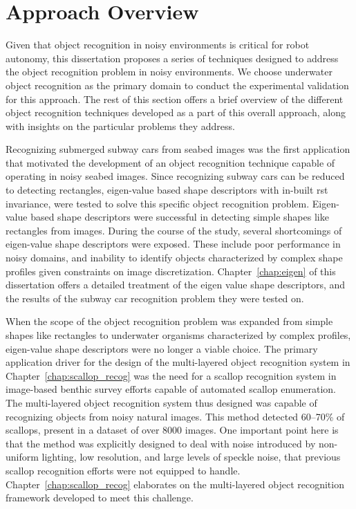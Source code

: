 \section{Approach Overview}

Given that object recognition in noisy environments is critical for robot autonomy, this dissertation proposes a series of techniques designed to address the object recognition problem in noisy environments.
We choose
underwater object recognition as the primary domain to conduct the experimental validation for this approach.
The rest of this section offers a brief overview of the different object recognition techniques developed as a part of this overall approach, along with insights on the particular problems they address.

Recognizing submerged subway cars from seabed images was the first application that motivated the development of an object recognition technique capable of operating in noisy seabed images. Since recognizing subway cars can be reduced 
to detecting rectangles, eigen-value based shape descriptors with in-built \gls{rst} invariance, were tested
to solve this specific object recognition problem. Eigen-value based shape descriptors were successful in detecting 
simple shapes like rectangles from images.
During the course of the study, several shortcomings of eigen-value shape descriptors were exposed. These include poor performance in noisy domains, and inability to identify objects characterized by complex shape profiles given constraints on image discretization. Chapter~\ref{chap:eigen} of this dissertation offers a detailed treatment of the eigen value shape descriptors, and the results of the subway car recognition problem they were tested on.

When the scope of the object recognition problem was expanded from simple shapes like rectangles to underwater organisms characterized by complex profiles,
eigen-value shape descriptors were no longer a viable choice. The primary application driver for the design of the multi-layered object recognition system in Chapter~\ref{chap:scallop_recog} was the need for a 
scallop recognition system in image-based benthic survey efforts capable of automated scallop enumeration. 
The multi-layered object recognition system thus designed was capable of recognizing objects from noisy natural images. This method detected 60--70\% of scallops, present in a dataset of over 8000 images. One important point here is that the method was explicitly designed to deal with noise introduced by non-uniform lighting, low resolution, and large levels of speckle noise, that previous scallop recognition efforts were not equipped to handle. Chapter~\ref{chap:scallop_recog} elaborates on the multi-layered object recognition framework developed to meet this challenge.

